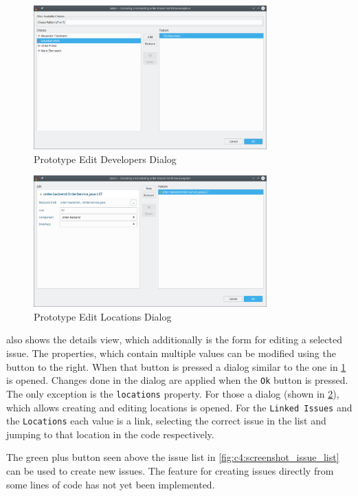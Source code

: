 \begin{figure}[!h]
	\centering
	\includegraphics[width=0.8\textwidth]{graphics/screenshot_gropius_ei_edit_list.png}
	\caption{Prototype Edit Developers Dialog}
	\label{fig:c4:screenshot_edit_list}
\end{figure}

\begin{figure}[!h]
	\centering
	\includegraphics[width=0.8\textwidth]{graphics/screenshot_gropius_ei_edit_locations.png}
	\caption{Prototype Edit Locations Dialog}
	\label{fig:c4:screenshot_edit_locations}
\end{figure}

 also shows the details view, which additionally is the form for editing a selected issue.
The properties, which contain multiple values can be modified using the button to the right.
When that button is pressed a dialog similar to the one in \cref{fig:c4:screenshot_edit_list} is opened.
Changes done in the dialog are applied when the \lstinline|Ok| button is pressed.
The only exception is the \lstinline|locations| property.
For those a dialog (shown in \cref{fig:c4:screenshot_edit_locations}), which allows creating and editing locations is opened.
For the \lstinline|Linked Issues| and the \lstinline|Locations| each value is a link, 
selecting the correct issue in the list and jumping to that location in the code respectively.

The green plus button seen above the issue list in \cref{fig:c4:screenshot_issue_list} can be used to create new issues.
The feature for creating issues directly from some lines of code has not yet been implemented.
